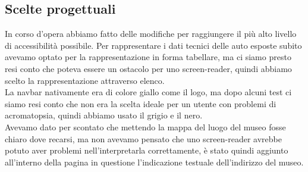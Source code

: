 \subsection{Scelte progettuali}
In corso d'opera abbiamo fatto delle modifiche per raggiungere il più alto livello di accessibilità possibile.
Per rappresentare i dati tecnici delle auto esposte subito avevamo optato per la rappresentazione in forma
tabellare, ma ci siamo presto resi conto che poteva essere un ostacolo per uno screen-reader, quindi abbiamo
scelto la rappresentazione attraverso elenco. \\
La navbar nativamente era di colore giallo come il logo, ma dopo alcuni test ci siamo resi conto che non era
la scelta ideale per un utente con problemi di acromatopsia, quindi abbiamo usato il grigio e il nero. \\
Avevamo dato per scontato che mettendo la mappa del luogo del museo fosse chiaro dove recarsi, ma non avevamo
pensato che uno screen-reader avrebbe potuto aver problemi nell'interpretarla correttamente, è stato quindi aggiunto all'interno della pagina in questione l'indicazione testuale dell'indirizzo del museo.


